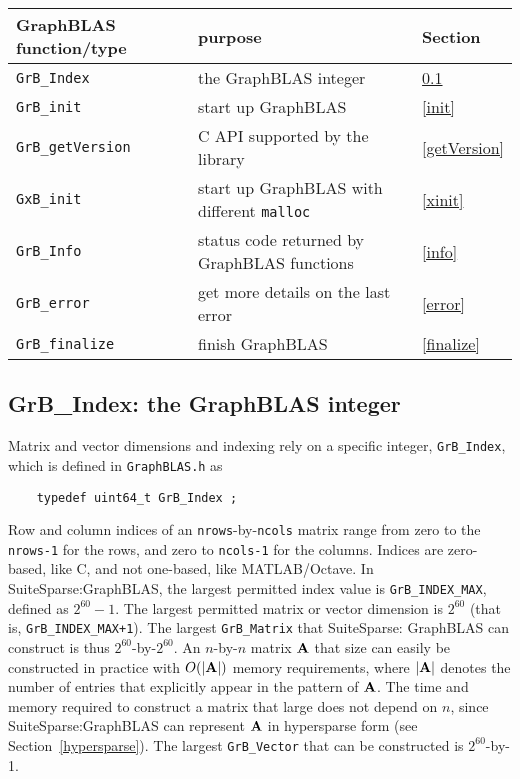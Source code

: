 \documentclass[12pt]{article}
\begin{document}
\vspace{0.2in}
{\footnotesize
\begin{tabular}{lll}
\hline
GraphBLAS function/type   & purpose                                 & Section \\
\hline
\verb'GrB_Index'     & the GraphBLAS integer                        & \ref{grbindex} \\
\verb'GrB_init'      & start up GraphBLAS                           & \ref{init} \\
\verb'GrB_getVersion'& C API supported by the library               & \ref{getVersion} \\
\verb'GxB_init'      & start up GraphBLAS with different \verb'malloc' & \ref{xinit} \\
\verb'GrB_Info'      & status code returned by GraphBLAS functions  & \ref{info} \\
\verb'GrB_error'     & get more details on the last error           & \ref{error} \\
\verb'GrB_finalize'  & finish GraphBLAS                             & \ref{finalize} \\
\hline
\end{tabular}
}
\vspace{0.2in}

\subsection{{\sf GrB\_Index:} the GraphBLAS integer} %
\label{grbindex}

Matrix and vector dimensions and indexing rely on a specific integer,
\verb'GrB_Index', which is defined in \verb'GraphBLAS.h' as

    {\footnotesize
    \begin{verbatim}
    typedef uint64_t GrB_Index ; \end{verbatim}}

Row and column indices of an \verb'nrows'-by-\verb'ncols' matrix range from
zero to the \verb'nrows-1' for the rows, and zero to \verb'ncols-1' for the
columns.  Indices are zero-based, like C, and not one-based, like
MATLAB/Octave.  In SuiteSparse:GraphBLAS, the largest permitted index value
is \verb'GrB_INDEX_MAX', defined as $2^{60}-1$.  The largest permitted
matrix or vector dimension is $2^{60}$ (that is, \verb'GrB_INDEX_MAX+1').
The largest \verb'GrB_Matrix' that
SuiteSparse: GraphBLAS can construct is thus $2^{60}$-by-$2^{60}$.  An
$n$-by-$n$ matrix $\bf A$ that size can easily be constructed in practice with
$O(|{\bf A}|)$ memory requirements, where $|{\bf A}|$ denotes the number of
entries that explicitly appear in the pattern of ${\bf A}$.  The time and
memory required to construct a matrix that large does not depend on $n$, since
SuiteSparse:GraphBLAS can represent ${\bf A}$ in hypersparse form (see
Section~\ref{hypersparse}).  The largest \verb'GrB_Vector' that can be
constructed is $2^{60}$-by-1.
\end{document}
